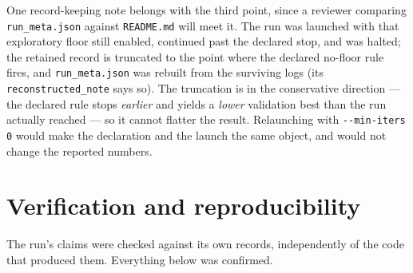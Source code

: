 \documentclass[11pt,a4paper]{article}
\newcommand{\code}[1]{\texttt{#1}}
\newcommand{\file}[1]{\texttt{#1}}
\begin{document}
\noindent
One record-keeping note belongs with the third point, since a reviewer comparing
\file{run\_meta.json} against \file{README.md} will meet it. The run was launched with that
exploratory floor still enabled, continued past the declared stop, and was halted; the retained
record is truncated to the point where the declared no-floor rule fires, and
\file{run\_meta.json} was rebuilt from the surviving logs (its \code{reconstructed\_note} says
so). The truncation is in the conservative direction --- the declared rule stops \emph{earlier}
and yields a \emph{lower} validation best than the run actually reached --- so it cannot
flatter the result. Relaunching with \code{-{}-min-iters 0} would make the declaration and the
launch the same object, and would not change the reported numbers.

\section{Verification and reproducibility}
\label{sec:verification}

The run's claims were checked against its own records, independently of the code that produced
them. Everything below was confirmed.
\end{document}
